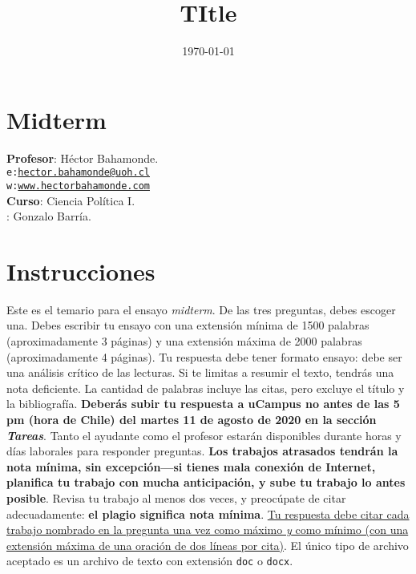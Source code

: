 \documentclass[onesided]{article}\usepackage[]{graphicx}\usepackage[]{color}
\title{TItle} %
\date{\today}
\begin{document}










\clearpage
\newpage
{}
\setcounter{page}{1}

\section{Midterm}

{\bf Profesor}: H\'ector Bahamonde.\\
\texttt{e:}\href{mailto:hector.bahamonde@uoh.cl}{\texttt{hector.bahamonde@uoh.cl}}\\
\texttt{w:}\href{http://www.hectorbahamonde.com}{\texttt{www.hectorbahamonde.com}}\\
{\bf Curso}: Ciencia Pol\'itica I.\\
\hspace{-5mm}{\bf Ayudante}: Gonzalo Barr\'ia.

\section*{Instrucciones}
Este es el temario para el ensayo \emph{midterm}. De las tres preguntas, debes escoger una. Debes escribir tu ensayo con una extensi\'on m\'inima de 1500 palabras (aproximadamente 3 p\'aginas) y una extensi\'on m\'axima de 2000 palabras (aproximadamente 4 p\'aginas). Tu respuesta debe tener formato ensayo: debe ser una an\'alisis cr\'itico de las lecturas. Si te limitas a resumir el texto, tendr\'as una nota deficiente. La cantidad de palabras incluye las citas, pero excluye el t\'itulo y la bibliograf\'ia. {\bf Deber\'as subir tu respuesta a uCampus no antes de las 5 pm (hora de Chile) del martes 11 de agosto de 2020 en la secci\'on \emph{Tareas}}. Tanto el ayudante como el profesor estar\'an disponibles durante horas y d\'ias laborales para responder preguntas. {\bf Los trabajos atrasados tendr\'an la nota m\'inima, sin excepci\'on---si tienes mala conexi\'on de Internet, planifica tu trabajo con mucha anticipaci\'on, y sube tu trabajo lo antes posible}. Revisa tu trabajo al menos dos veces, y preoc\'upate de citar adecuadamente: {\bf el plagio significa nota m\'inima}. \ul{Tu respuesta debe citar cada trabajo nombrado en la pregunta una vez como m\'aximo \emph{y} como m\'inimo (con una extensi\'on m\'axima de una oraci\'on de dos l\'ineas por cita)}. El \'unico tipo de archivo aceptado es un archivo de texto con extensi\'on \texttt{doc} o \texttt{docx}.
\end{document}

